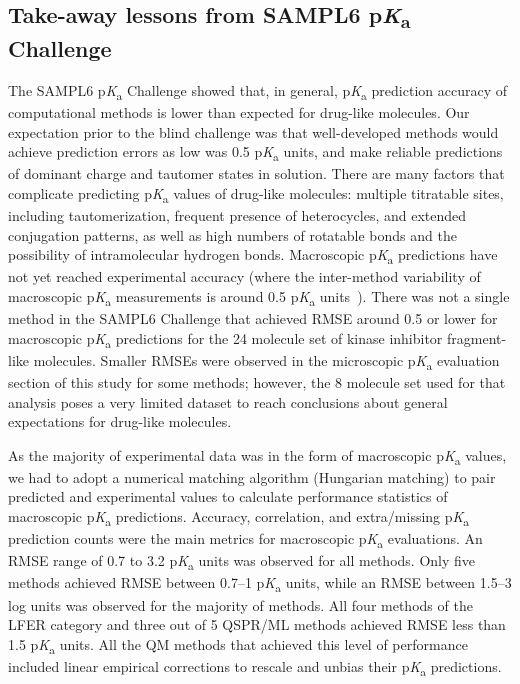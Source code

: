 \documentclass[9pt,lineno,final]{elife}
\newcommand{\pKa}{p\textit{K}\textsubscript{a}}
\begin{document}
\subsection{Take-away lessons from SAMPL6 \pKa{} Challenge}

The SAMPL6 \pKa{} Challenge showed that, in general, \pKa{} prediction accuracy of computational methods is lower than expected for drug-like molecules. 
Our expectation prior to the blind challenge was that well-developed methods would achieve prediction errors as low was 0.5 \pKa{} units, and make reliable predictions of dominant charge and tautomer states in solution. 
There are many factors that complicate predicting \pKa{} values of drug-like molecules: multiple titratable sites, including tautomerization, frequent presence of heterocycles, and extended conjugation patterns, as well as high numbers of rotatable bonds and the possibility of intramolecular hydrogen bonds.
Macroscopic \pKa{} predictions have not yet reached experimental accuracy (where the inter-method variability of macroscopic \pKa{} measurements is around 0.5 \pKa{} units~\citep{Fraczkiewicz:2013:ReferenceModuleinChemistryMolecularSciencesandChemicalEngineering}). 
There was not a single method in the SAMPL6 Challenge that achieved RMSE around 0.5 or lower for macroscopic \pKa{} predictions for the 24 molecule set of kinase inhibitor fragment-like molecules.
Smaller RMSEs were observed in the microscopic \pKa{} evaluation section of this study for some methods; however, the 8 molecule set used for that analysis poses a very limited dataset to reach conclusions about general expectations for drug-like molecules.

As the majority of experimental data was in the form of macroscopic \pKa{} values, we had to adopt a numerical matching algorithm (Hungarian matching) to pair predicted and experimental values to calculate performance statistics of macroscopic \pKa{} predictions. 
Accuracy, correlation, and extra/missing \pKa{} prediction counts were the main metrics for macroscopic \pKa{} evaluations. 
An RMSE range of 0.7 to 3.2 \pKa{} units was observed for all methods.
Only five methods achieved RMSE between 0.7--1 \pKa{} units, while an RMSE between 1.5--3 log units was observed for the majority of methods. 
All four methods of the LFER category and three out of 5 QSPR/ML methods achieved RMSE less than 1.5 \pKa{} units.
All the QM methods that achieved this level of performance included linear empirical corrections to rescale and unbias their \pKa{} predictions. 
\end{document}
